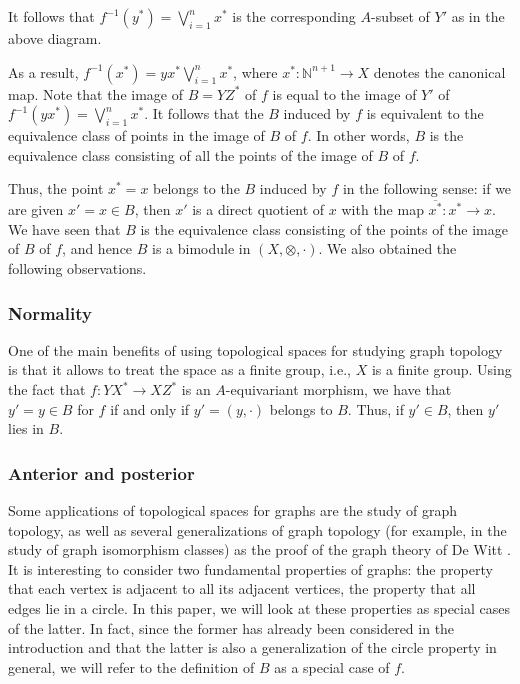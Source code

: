 \documentclass[a4paper,reqno,oneside]{article}
\begin{document}
It follows that $f^{-1}(y^*)=\bigvee_{i=1}^n x^*$ is the corresponding $A$-subset of $Y'$ as in the above diagram. 

As a result, $f^{-1}(x^*)=yx^*\bigvee_{i=1}^n x^*$, where $x^*:\mathbb{N}^{n+1}\to X$ denotes the canonical map. Note that the image of $B=YZ^*$ of $f$ is equal to the image of $Y'$ of $f^{-1}(yx^*)=\bigvee_{i=1}^n x^*$. It follows that the $B$ induced by $f$ is equivalent to the equivalence class of points in the image of $B$ of $f$. In other words, $B$ is the equivalence class consisting of all the points of the image of $B$ of $f$. 

Thus, the point $x^*=x$ belongs to the $B$ induced by $f$ in the following sense: if we are given $x'=x\in B$, then $x'$ is a direct quotient of $x$ with the map $\overline{x^*}:x^*\to x$. We have seen that $B$ is the equivalence class consisting of the points of the image of $B$ of $f$, and hence $B$ is a bimodule in $(X,\otimes,\cdot)$. We also obtained the following observations. 

\subsubsection{Normality} 
One of the main benefits of using topological spaces for studying graph topology is that it allows to treat the space as a finite group, i.e., $X$ is a finite group.  Using the fact that $f:YX^*\to XZ^*$ is an $A$-equivariant morphism, we have that $y'=y\in B$ for $f$ if and only if $y'=(y,\cdot)$ belongs to $B$.  Thus, if $y'\in B$, then $y'$ lies in $B$. 

\subsubsection{Anterior and posterior} 
Some applications of topological spaces for graphs are the study of graph topology, as well as several generalizations of graph topology (for example, in the study of graph isomorphism classes) as the proof of the graph theory of De Witt \cite{DeWitt:1966}. It is interesting to consider two fundamental properties of graphs: the property that each vertex is adjacent to all its adjacent vertices, the property that all edges lie in a circle. In this paper, we will look at these properties as special cases of the latter. In fact, since the former has already been considered in the introduction and that the latter is also a generalization of the circle property in general, we will refer to the definition of $B$ as a special case of $f$. 
\end{document}
